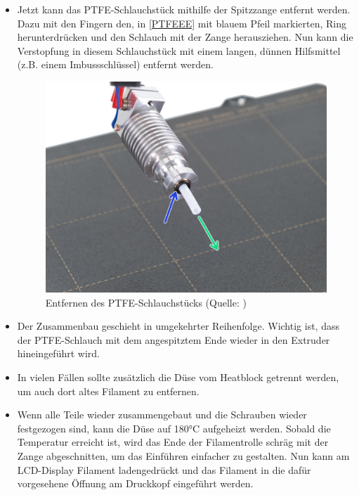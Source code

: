 \begin{itemize}
    \item Jetzt kann das PTFE-Schlauchstück mithilfe der Spitzzange entfernt werden. Dazu mit den Fingern den, in \autoref{PTFEEE} mit blauem Pfeil markierten, Ring herunterdrücken und den Schlauch mit der Zange herausziehen. Nun kann die Verstopfung in diesem Schlauchstück mit einem langen, dünnen Hilfsmittel (z.B. einem Imbussschlüssel) entfernt werden.
      \begin{figure}[h] 
        \centering
        \includegraphics[width=0.5\linewidth]{bilder/Anleitung - Entfernen des PTFE-Schlauchs.jpg}
              \caption[Anleitung: Entfernen des PTFE-Schlauchstücks] {Entfernen des PTFE-Schlauchstücks (Quelle: \autocite{Prusa})}
        \label{PTFEEE}
      \end{figure}
      \FloatBarrier

    \item Der Zusammenbau geschieht in umgekehrter Reihenfolge. Wichtig ist, dass der PTFE-Schlauch mit dem angespitztem Ende wieder in den Extruder hineingeführt wird.
    \item In vielen Fällen sollte zusätzlich die Düse vom Heatblock getrennt werden, um auch dort altes Filament zu entfernen.
    \item Wenn alle Teile wieder zusammengebaut und die Schrauben wieder festgezogen sind, kann die Düse auf 180°C aufgeheizt werden. Sobald die Temperatur erreicht ist, wird das Ende der Filamentrolle schräg mit der Zange abgeschnitten, um das Einführen einfacher zu gestalten. Nun kann am LCD-Display \glqq Filament laden\grqq gedrückt und das Filament in die dafür vorgesehene Öffnung am Druckkopf eingeführt werden.
\end{itemize}